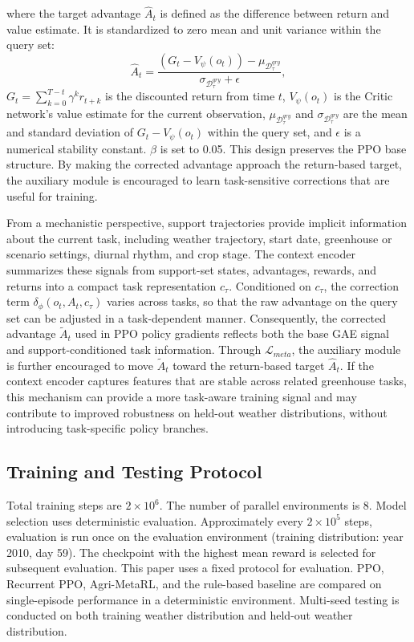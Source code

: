 \documentclass[number,preprint,review,12pt]{elsarticle}
\begin{document}
where the target advantage $\hat{A}_t$ is defined as the difference between return and value estimate. It is standardized to zero mean and unit variance within the query set:
\begin{equation}
\hat{A}_t = \frac{(G_t - V_\psi(o_t)) - \mu_{\mathcal{D}_{\tau}^{qry}}}{\sigma_{\mathcal{D}_{\tau}^{qry}} + \epsilon},
\end{equation}
$G_t = \sum_{k=0}^{T-t} \gamma^k r_{t+k}$ is the discounted return from time $t$, $V_\psi(o_t)$ is the Critic network's value estimate for the current observation, $\mu_{\mathcal{D}_{\tau}^{qry}}$ and $\sigma_{\mathcal{D}_{\tau}^{qry}}$ are the mean and standard deviation of $G_t - V_\psi(o_t)$ within the query set, and $\epsilon$ is a numerical stability constant. $\beta$ is set to 0.05. This design preserves the PPO base structure. By making the corrected advantage approach the return-based target, the auxiliary module is encouraged to learn task-sensitive corrections that are useful for training.

From a mechanistic perspective, support trajectories provide implicit information about the current task, including weather trajectory, start date, greenhouse or scenario settings, diurnal rhythm, and crop stage. The context encoder summarizes these signals from support-set states, advantages, rewards, and returns into a compact task representation $c_{\tau}$. Conditioned on $c_{\tau}$, the correction term $\delta_{\phi}(o_t, A_t, c_{\tau})$ varies across tasks, so that the raw advantage on the query set can be adjusted in a task-dependent manner. Consequently, the corrected advantage $\tilde{A}_t$ used in PPO policy gradients reflects both the base GAE signal and support-conditioned task information. Through $\mathcal{L}_{meta}$, the auxiliary module is further encouraged to move $\tilde{A}_t$ toward the return-based target $\hat{A}_t$. If the context encoder captures features that are stable across related greenhouse tasks, this mechanism can provide a more task-aware training signal and may contribute to improved robustness on held-out weather distributions, without introducing task-specific policy branches.

\subsection{Training and Testing Protocol}
Total training steps are $2\times10^6$. The number of parallel environments is 8. Model selection uses deterministic evaluation. Approximately every $2\times10^5$ steps, evaluation is run once on the evaluation environment (training distribution: year 2010, day 59). The checkpoint with the highest mean reward is selected for subsequent evaluation. This paper uses a fixed protocol for evaluation. PPO, Recurrent PPO, Agri-MetaRL, and the rule-based baseline are compared on single-episode performance in a deterministic environment. Multi-seed testing is conducted on both training weather distribution and held-out weather distribution.
\end{document}
